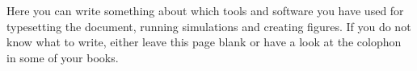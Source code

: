\thispagestyle{empty}
{\small
\strut\vfill %
\noindent Here you can write something about which tools and software you have used for typesetting the document, running simulations and creating figures. If you do not know what to write, either leave this page blank or have a look at the colophon in some of your books.
}
\clearpage

